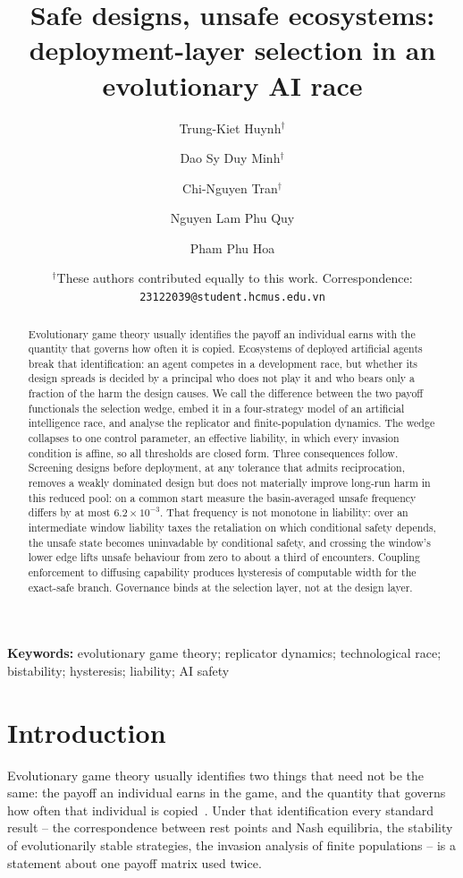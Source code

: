 \documentclass[11pt,a4paper]{article}
\title{\bfseries Safe designs, unsafe ecosystems: deployment-layer selection
in an evolutionary AI race}
\author[1,2]{Trung-Kiet Huynh$^{\dagger}$}
\author[1,2]{Dao Sy Duy Minh$^{\dagger}$}
\author[1,2]{Chi-Nguyen Tran$^{\dagger}$}
\author[1,2]{Nguyen Lam Phu Quy}
\author[1,2]{Pham Phu Hoa}
\affil[1]{Faculty of Information Technology, University of Science (HCMUS), Ho Chi Minh City, Vietnam}\affil[2]{Vietnam National University -- Ho Chi Minh City (VNU-HCM), Ho Chi Minh City, Vietnam}
\date{\normalsize $^{\dagger}$These authors contributed equally to this work. Correspondence: \texttt{23122039@student.hcmus.edu.vn}}
\theoremstyle{definition}
\begin{document}
\maketitle

\begin{abstract}
\noindent
Evolutionary game theory usually identifies the payoff an individual earns with
the quantity that governs how often it is copied. Ecosystems of deployed
artificial agents break that identification: an agent competes in a development
race, but whether its design spreads is decided by a principal who does not play
it and who bears only a fraction of the harm the design causes. We call the
difference between the two payoff functionals the selection wedge, embed it in a
four-strategy model of an artificial intelligence race, and analyse the
replicator and finite-population dynamics. The wedge collapses to one control
parameter, an effective liability, in which every invasion condition is affine,
so all thresholds are closed form. Three consequences follow. Screening designs
before deployment, at any tolerance that admits reciprocation, removes a weakly
dominated design but does not materially improve long-run harm in this reduced
pool: on a common start measure the basin-averaged unsafe frequency differs by
at most $6.2\times10^{-3}$. That frequency is not monotone in liability: over an
intermediate window liability taxes the retaliation on which conditional safety
depends, the unsafe state becomes uninvadable by conditional safety, and
crossing the window's lower edge lifts unsafe behaviour from zero to about a
third of encounters. Coupling enforcement to diffusing capability produces
hysteresis of computable width for the exact-safe branch. Governance binds at
the selection layer, not at the design layer.
\end{abstract}

\noindent\textbf{Keywords:} evolutionary game theory; replicator dynamics;
technological race; bistability; hysteresis; liability; AI safety


\section{Introduction}

Evolutionary game theory usually identifies two things that need not be the
same: the payoff an individual earns in the game, and the quantity that
governs how often that individual is copied~\citep{maynardsmith1982evolution,taylor1978evolutionarily,hofbauer1998evolutionary,hofbauer2003evolutionary,nowak2006evolutionary}.
Under that identification every standard result -- the correspondence between
rest points and Nash equilibria, the stability of evolutionarily stable
strategies, the invasion analysis of finite populations -- is a statement
about one payoff matrix used twice.
\end{document}
